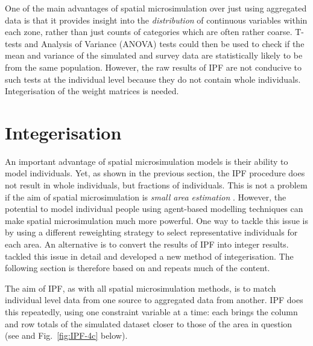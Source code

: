 One of the main advantages %
of spatial microsimulation over just using aggregated data is that it provides
insight into the \emph{distribution} of continuous variables within each zone,
rather than just counts of categories which are often rather coarse. T-tests and
Analysis of Variance (ANOVA) tests could then be used to check if the
mean and variance of the simulated and survey data are statistically likely
to be from the same population. However, the raw results of IPF are not
conducive to such tests at the individual level because they do not contain
whole individuals. Integerisation of the weight matrices is needed.


\section{Integerisation} 
\label{s:integerisation}
An important advantage of spatial microsimulation models is their ability
to model individuals. Yet, as shown in the previous section, the IPF
procedure does not result in whole individuals, but fractions of individuals.
This is not a problem if the aim of spatial microsimulation is \emph{small area
estimation} \citep{Ballas2005b}. However, the potential to model individual
people using agent-based modelling techniques can make spatial microsimulation
much more powerful. One way to tackle this issue is by using a different
reweighting strategy to select representative individuals for each area.
An alternative is to convert the results of IPF into
integer results. \citet{Lovelace2013-trs} tackled this issue in detail and
developed a new method of integerisation. The following section is therefore
based on \citet{Lovelace2013-trs} and repeats much of the content.

The aim of IPF, as with all spatial microsimulation methods, is to  match
individual level data from one source to aggregated data from another.
IPF does this repeatedly, using one constraint variable at a time: each
brings the column and row totals of the simulated dataset closer to
those of the area in question (see \citealp{Ballas2005b} and
Fig.~\ref{fig:IPF-4c} below).

